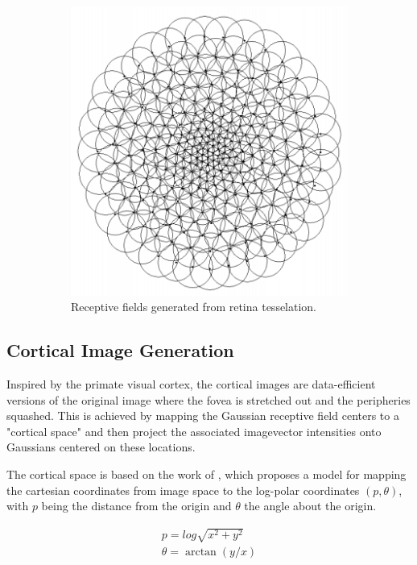 \documentclass{l4proj}
\begin{document}
\begin{figure}[H]
\begin{subfigure}[b]{0.49\textwidth}
    \includegraphics[width=\textwidth]{l4template-master/gaussian_rfs.png}
    \caption{Receptive fields generated from retina tesselation.}
    \label{gaussianrf}
  \end{subfigure} 
  \caption{}
  \label{retina}
 \end{figure}

\subsection{Cortical Image Generation}


Inspired by the primate visual cortex, the cortical images are data-efficient versions of the original image where the fovea is stretched out and the peripheries squashed. This is achieved by mapping the Gaussian receptive field centers to a "cortical space" and then project the associated imagevector intensities onto Gaussians centered on these locations. 

The cortical space is based on the work of \citet{Schwartz1977}, which proposes a model for mapping the cartesian coordinates from image space to the log-polar coordinates $(p,\theta)$, with $p$ being the distance from the origin and $\theta$ the angle about the origin.

\begin{align}
    p = log \sqrt{x^2 + y^2} \\ \nonumber
    \theta = \arctan(y/x)
\end{align}
\end{document}
